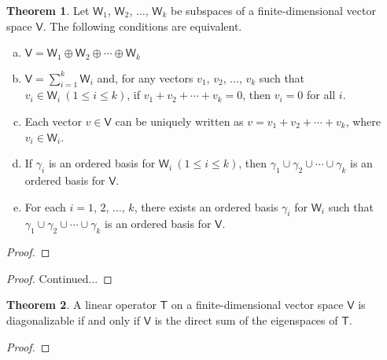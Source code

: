 \documentclass[12pt]{book}
\theoremstyle{definition}
\newtheorem{theorem}{Theorem}[chapter]
\begin{document}
	\begin{theorem}
		Let $\mathsf{W}_1$, $\mathsf{W}_2$, $\ldots$, $\mathsf{W}_k$ be subspaces of a finite-dimensional vector space $\mathsf{V}$. The following conditions are equivalent.
		\begin{enumerate}[(a)]
			\item $\mathsf{V}=\mathsf{W}_1\oplus\mathsf{W}_2\oplus\cdots\oplus\mathsf{W}_k$
			\item $\mathsf{V}=\displaystyle\sum_{i=1}^k \mathsf{W}_i$ and, for any vectors $v_1$, $v_2$, $\ldots$, $v_k$ such that $v_i\in\mathsf{W}_i\ (1\leq i\leq k)$, if $v_1+v_2+\cdots+v_k=\mathit{0}$, then $v_i=\mathit{0}$ for all $i$.
			\item Each vector $v\in\mathsf{V}$ can be uniquely written as $v=v_1+v_2+\cdots+v_k$, where $v_i\in\mathsf{W}_i$.
			\item If $\gamma_i$ is an ordered basis for $\mathsf{W}_i\ (1\leq i\leq k)$, then $\gamma_1\cup\gamma_2\cup\cdots\cup\gamma_k$ is an ordered basis for $\mathsf{V}$.
			\item For each $i=1$, $2$, $\ldots$, $k$, there exists an ordered basis $\gamma_i$ for $\mathsf{W}_i$ such that $\gamma_1\cup\gamma_2\cup\cdots\cup\gamma_k$ is an ordered basis for $\mathsf{V}$.
		\end{enumerate}
	\end{theorem}
	\begin{proof}
	\end{proof}
	\newpage
	\begin{proof}{Continued...}
		
	\end{proof}
	\newpage
	\begin{theorem}
		A linear operator $\mathsf{T}$ on a finite-dimensional vector space $\mathsf{V}$ is diagonalizable if and only if $\mathsf{V}$ is the direct sum of the eigenspaces of $\mathsf{T}$.
	\end{theorem}
	\begin{proof}
	\end{proof}
	\setcounter{chapter}{5}
	\newpage
\end{document}
